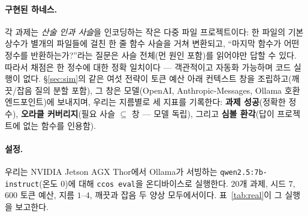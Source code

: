 \documentclass[11pt]{article}
\newcommand{\code}[1]{\texttt{#1}}
\begin{document}
\paragraph{구현된 하네스.} 각 과제는 \emph{산술 인과 사슬}을 인코딩하는 작은 다중 파일 프로젝트이다: 한 파일의 기본
상수가 별개의 파일들에 걸친 한 줄 함수 사슬을 거쳐 변환되고, ``마지막 함수가 어떤 정수를 반환하는가?''라는 질문은
사슬 전체(먼 원인 포함)를 읽어야만 답할 수 있다. 따라서 채점은 한 정수에 대한 정확 일치이다 --- 객관적이고 자동화
가능하며 코드 실행이 없다. \S\ref{sec:sim}의 같은 여섯 전략이 토큰 예산 아래 컨텍스트 창을 조립하고(깨끗/잡음 질의
분할 포함), 그 창은 모델(OpenAI, Anthropic-Messages, Ollama 호환 엔드포인트)에 보내지며, 우리는 지름별로 세 지표를
기록한다: \textbf{과제 성공}(정확한 정수), \textbf{오라클 커버리지}(필요 사슬 $\subseteq$ 창 --- 모델 독립),
그리고 \textbf{심볼 환각}(답이 프로젝트에 없는 함수를 인용함).

\paragraph{설정.} 우리는 NVIDIA Jetson AGX Thor에서 Ollama가 서빙하는 \code{qwen2.5:7b-instruct}(온도 $0$)에
대해 \code{ccos eval}을 온디바이스로 실행한다. $20$개 과제, 시드 $7$, $600$ 토큰 예산, 지름 $1$--$4$, 깨끗과 잡음
두 양상 모두에서이다. 표~\ref{tab:real}이 그 실행을 보고한다.
\end{document}
